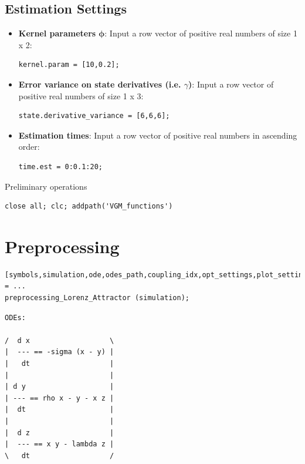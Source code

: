 \subsection{Estimation Settings}
\vspace{1em}
\begin{itemize}
   \item \textbf{Kernel parameters} $\boldsymbol\phi$: Input a row vector of positive real numbers of size 1 x 2:
    \color{RoyalPurple}\begin{verbatim}
kernel.param = [10,0.2];
\end{verbatim} 
\color{black}


   \item \textbf{Error variance on state derivatives (i.e. $\gamma$)}: Input a row vector of positive real numbers of size 1 x 3:
    \color{RoyalPurple}\begin{verbatim}
state.derivative_variance = [6,6,6];
\end{verbatim} 
\color{black}

   \item \textbf{Estimation times}: Input a row vector of positive real numbers in ascending order:
    \color{RoyalPurple}\begin{verbatim}
time.est = 0:0.1:20;
\end{verbatim} 
\color{black}
\end{itemize}

\vspace{2em}

\begin{par}
Preliminary operations
\end{par} \vspace{1em}
\color{RoyalPurple}\begin{verbatim}
close all; clc; addpath('VGM_functions')
\end{verbatim} 
\color{black}
\vspace{2em}

\section{Preprocessing}

\color{RoyalPurple}\begin{verbatim}
[symbols,simulation,ode,odes_path,coupling_idx,opt_settings,plot_settings] = ...
preprocessing_Lorenz_Attractor (simulation);
\end{verbatim} 

{\centering

        \color{MidnightBlue} \begin{verbatim} 
ODEs:
 
/  d x                   \
|  --- == -sigma (x - y) |
|   dt                   |
|                        |
| d y                    |
| --- == rho x - y - x z |
|  dt                    |
|                        |
|  d z                   |
|  --- == x y - lambda z |
\   dt                   /

\end{verbatim} 

}
\color{black} 


